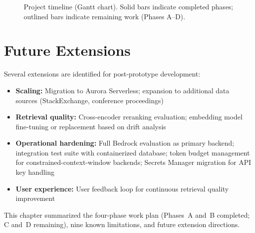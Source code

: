 \begin{figure}[H]
{%
}
\caption{Project timeline (Gantt chart). Solid bars indicate completed phases; outlined bars indicate remaining work (Phases A--D).}
\label{fig:gantt}
\end{figure}

\section{Future Extensions}
\label{sec:future}

Several extensions are identified for post-prototype development:

\begin{itemize}[leftmargin=0.5in]
  \item \textbf{Scaling:} Migration to Aurora Serverless; expansion to additional data sources (StackExchange, conference proceedings)
  \item \textbf{Retrieval quality:} Cross-encoder reranking evaluation; embedding model fine-tuning or replacement based on drift analysis
  \item \textbf{Operational hardening:} Full Bedrock evaluation as primary backend; integration test suite with containerized database; token budget management for constrained-context-window backends; Secrets Manager migration for API key handling
  \item \textbf{User experience:} User feedback loop for continuous retrieval quality improvement
\end{itemize}

\medskip
\noindent This chapter summarized the four-phase work plan (Phases~A and~B completed; C and~D remaining), nine known limitations, and future extension directions.
